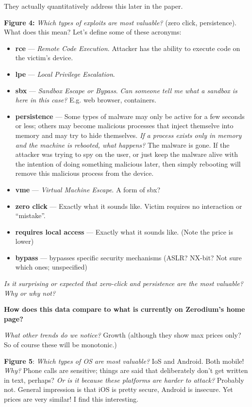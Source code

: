 \documentclass[11pt]{article}
\begin{document}
They actually quantitatively address this later in the paper. 

{\bf Figure 4:} {\it Which types of exploits are most valuable?} (zero click, persistence). What does this mean? Let's define some of these acronyms:
\begin{itemize}
    \item {\bf rce} --- {\it Remote Code Execution}. Attacker has the ability to execute code on the victim's device. 
    \item {\bf lpe} --- {\it Local Privilege Escalation}. 
    \item {\bf sbx} --- {\it Sandbox Escape or Bypass}. {\it Can someone tell me what a sandbox is here in this case? } E.g. web browser, containers.
    \item {\bf persistence} --- Some types of malware may only be active for a few seconds or less; others may become malicious processes that inject themselve into memory and may try to hide themselves. {\it If a process exists only in memory and the machine is rebooted, what happens?} The malware is gone. If the attacker was trying to spy on the user, or just keep the malware alive with the intention of doing something malicious later, then simply rebooting will remove this malicious process from the device. 
    \item {\bf vme} --- {\it Virtual Machine Escape}. A form of sbx?
    \item {\bf zero click} --- Exactly what it sounds like. Victim requires no interaction or ``mistake''.
    \item {\bf requires local access} --- Exactly what it sounds like. (Note the price is lower)
    \item {\bf bypass} --- bypasses specific security mechanisms (ASLR? NX-bit? Not sure which ones; unspecified)
\end{itemize}

{\it Is it surprising or expected that zero-click and persistence are the most valuable? Why or why not?} 

{\bf How does this data compare to what is currently on Zerodium's home page?}

{\it What other trends do we notice?} Growth (although they show max prices only? So of course these will be monotonic.)

{\bf Figure 5}: {\it Which types of OS are most valuable?} IoS and Android. Both mobile! {\it Why?} Phone calls are sensitive; things are said that deliberately don't get written in text, perhaps? {\it Or is it because these platforms are harder to attack?} Probably not. General impression is that iOS is pretty secure, Android is insecure. Yet prices are very similar! I find this interesting.
\end{document}
